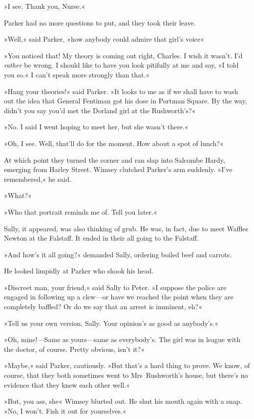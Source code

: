 »I see. Thank you, Nurse.«

Parker had no more questions to put, and they took their leave.

»Well,« said Parker, »how anybody could admire that girl's voice\longdash«

»You noticed that! My theory is coming out right, Charles. I wish it wasn't. I'd \textit{rather} be wrong. I should like to have you look pitifully at me and say, »I told you so.« I can't speak more strongly than that.«

»Hang your theories!« said Parker. »It looks to me as if we shall have to wash out the idea that General Fentiman got his dose in Portman Square. By the way, didn't you say you'd met the Dorland girl at the Rushworth's?«

»No. I said I went hoping to meet her, but she wasn't there.«

»Oh, I see. Well, that'll do for the moment. How about a spot of lunch?«

At which point they turned the corner and ran slap into Salcombe Hardy, emerging from Harley Street. Wimsey clutched Parker's arm suddenly. »I've remembered,« he said.

»What?«

»Who that portrait reminds me of. Tell you later.«

Sally, it appeared, was also thinking of grub. He was, in fact, due to meet Waffles Newton at the Falstaff. It ended in their all going to the Falstaff.

»And how's it all going?« demanded Sally, ordering boiled beef and carrots.

He looked limpidly at Parker who shook his head.

»Discreet man, your friend,« said Sally to Peter. »I suppose the police are engaged in following up a clew—or have we reached the point when they are completely baffled? Or do we say that an arrest is imminent, eh?«

»Tell us your own version, Sally. Your opinion's as good as anybody's.«

»Oh, mine!—Same as yours—same as everybody's. The girl was in league with the doctor, of course. Pretty obvious, isn't it?«

»Maybe,« said Parker, cautiously. »But that's a hard thing to prove. We know, of course, that they both sometimes went to Mrs~Rushworth's house, but there's no evidence that they knew each other well.«

»But, you ass, she\longdash« Wimsey blurted out. He shut his mouth again with a snap. »No, I won't. Fish it out for yourselves.«

